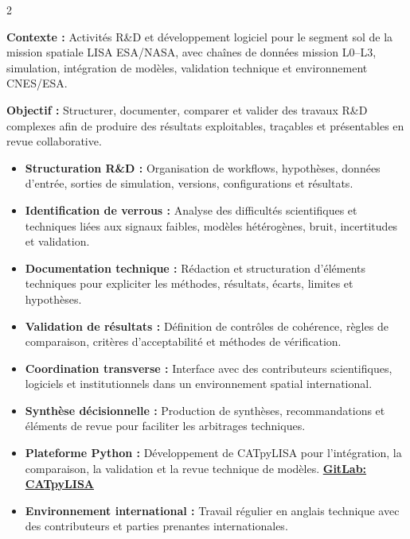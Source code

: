 \documentclass[8pt,a4paper,ragged2e,withhyper]{altacv}
\begin{document}
\begin{paracol}{2}
\divider


\textbf{Contexte :} Activités R\&D et développement logiciel pour le segment sol de la mission spatiale LISA ESA/NASA, avec chaînes de données mission L0--L3, simulation, intégration de modèles, validation technique et environnement CNES/ESA.

\textbf{Objectif :} Structurer, documenter, comparer et valider des travaux R\&D complexes afin de produire des résultats exploitables, traçables et présentables en revue collaborative.

\begin{itemize}
  \item \textbf{Structuration R\&D :} Organisation de workflows, hypothèses, données d’entrée, sorties de simulation, versions, configurations et résultats.
  \item \textbf{Identification de verrous :} Analyse des difficultés scientifiques et techniques liées aux signaux faibles, modèles hétérogènes, bruit, incertitudes et validation.
  \item \textbf{Documentation technique :} Rédaction et structuration d’éléments techniques pour expliciter les méthodes, résultats, écarts, limites et hypothèses.
  \item \textbf{Validation de résultats :} Définition de contrôles de cohérence, règles de comparaison, critères d’acceptabilité et méthodes de vérification.
  \item \textbf{Coordination transverse :} Interface avec des contributeurs scientifiques, logiciels et institutionnels dans un environnement spatial international.
  \item \textbf{Synthèse décisionnelle :} Production de synthèses, recommandations et éléments de revue pour faciliter les arbitrages techniques.
  \item \textbf{Plateforme Python :} Développement de CATpyLISA pour l’intégration, la comparaison, la validation et la revue technique de modèles.
  \textcolor{DarkPastelRed}{\href{https://gitlab.oca.eu/gboileau/lisa_l3_tools}{\bf GitLab: CATpyLISA}}
  \item \textbf{Environnement international :} Travail régulier en anglais technique avec des contributeurs et parties prenantes internationales.
\end{itemize}

\divider


\end{paracol}
\end{document}
